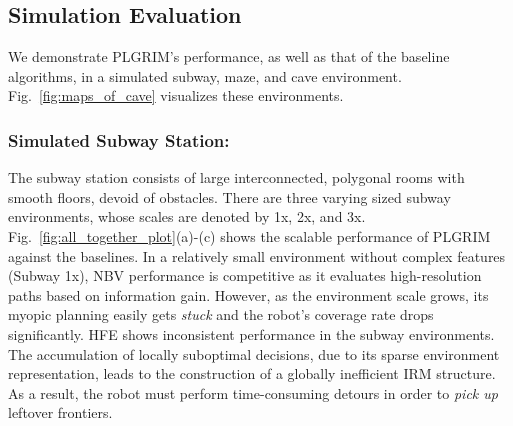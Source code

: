 \documentclass[letterpaper]{article} %
\begin{document}
\subsection{Simulation Evaluation}
We demonstrate PLGRIM's performance, as well as that of the baseline algorithms, in a simulated subway, maze, and cave environment. Fig.~\ref{fig:maps_of_cave} visualizes these environments.

\subsubsection{Simulated Subway Station:} \hfill
\vspace{-0.25pt}

\noindent
The subway station consists of large interconnected, polygonal rooms with smooth floors, devoid of obstacles. There are three varying sized subway environments, whose scales are denoted by 1x, 2x, and 3x. 
Fig.~\ref{fig:all_together_plot}(a)-(c) shows the scalable performance of PLGRIM against the baselines. 
In a relatively small environment without complex features (Subway 1x), NBV performance is competitive as it evaluates high-resolution paths based on information gain.
However, as the environment scale grows, its myopic planning easily gets \textit{stuck} and the robot's coverage rate drops significantly. 
HFE shows inconsistent performance in the subway environments. The accumulation of locally suboptimal decisions, due to its sparse environment representation, leads to the construction of a globally inefficient IRM structure. As a result, the robot must perform time-consuming detours in order to \textit{pick up} leftover frontiers.  
\end{document}
